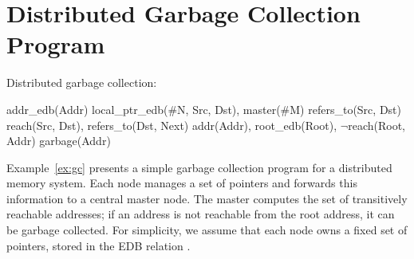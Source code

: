 \section{Distributed Garbage Collection Program}
\label{ap:garbage}

\begin{example}                                                                
\label{ex:gc}                                                                  
Distributed garbage collection:                                                

\begin{Drules}                                                                 
        {addr_edb(Addr)}                                                       
        {local_ptr_edb(#N, Src, Dst), master(#M)}                              
        {refers_to(Src, Dst)}                                                  
        {reach(Src, Dst), refers_to(Dst, Next)}                                
        {addr(Addr), root_edb(Root), $\lnot$reach(Root, Addr)}                 
   {garbage(Addr)}                                   
\end{Drules}                                                                   
\end{example}                                                                  

Example~\ref{ex:gc} presents a simple garbage collection program for a         
distributed memory system. Each node manages a set of pointers and forwards this                                                                              
information to a central master node. The master computes the set of           
transitively reachable addresses; if an address is not reachable from the root
address, it can be garbage collected. For                                      
simplicity, we assume that each node owns a fixed set of pointers, stored in the                                                                              
EDB relation .                                          

